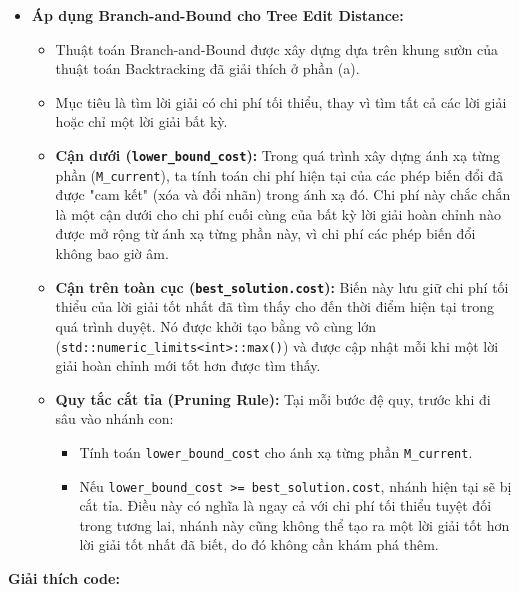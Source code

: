\documentclass{article}
\begin{document}
\begin{itemize}
    \item \textbf{Áp dụng Branch-and-Bound cho Tree Edit Distance:}
    \begin{itemize}
        \item Thuật toán Branch-and-Bound được xây dựng dựa trên khung sườn của thuật toán Backtracking đã giải thích ở phần (a).
        \item Mục tiêu là tìm lời giải có chi phí tối thiểu, thay vì tìm tất cả các lời giải hoặc chỉ một lời giải bất kỳ.
        \item \textbf{Cận dưới (\texttt{lower\_bound\_cost}):} Trong quá trình xây dựng ánh xạ từng phần (\texttt{M\_current}), ta tính toán chi phí hiện tại của các phép biến đổi đã được "cam kết" (xóa và đổi nhãn) trong ánh xạ đó. Chi phí này chắc chắn là một cận dưới cho chi phí cuối cùng của bất kỳ lời giải hoàn chỉnh nào được mở rộng từ ánh xạ từng phần này, vì chi phí các phép biến đổi không bao giờ âm.
        \item \textbf{Cận trên toàn cục (\texttt{best\_solution.cost}):} Biến này lưu giữ chi phí tối thiểu của lời giải tốt nhất đã tìm thấy cho đến thời điểm hiện tại trong quá trình duyệt. Nó được khởi tạo bằng vô cùng lớn (\texttt{std::numeric\_limits<int>::max()}) và được cập nhật mỗi khi một lời giải hoàn chỉnh mới tốt hơn được tìm thấy.
        \item \textbf{Quy tắc cắt tỉa (Pruning Rule):} Tại mỗi bước đệ quy, trước khi đi sâu vào nhánh con:
            \begin{itemize}
                \item Tính toán \texttt{lower\_bound\_cost} cho ánh xạ từng phần \texttt{M\_current}.
                \item Nếu \texttt{lower\_bound\_cost >= best\_solution.cost}, nhánh hiện tại sẽ bị cắt tỉa. Điều này có nghĩa là ngay cả với chi phí tối thiểu tuyệt đối trong tương lai, nhánh này cũng không thể tạo ra một lời giải tốt hơn lời giải tốt nhất đã biết, do đó không cần khám phá thêm.
            \end{itemize}
    \end{itemize}
\end{itemize}

\textbf{Giải thích code:}
\end{document}
